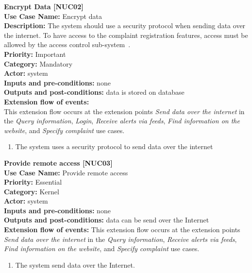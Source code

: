 \documentclass[11pt,twoside]{article}
\begin{document}
\textbf{Encrypt Data [NUC02]}\\
\textbf{Use Case Name:} Encrypt data\\
\textbf{Description:} The system should use a security protocol when sending data over the internet. To have access to the complaint
registration features, access must be allowed by the access control sub-system~\cite{hw-usecase}.\\
\textbf{Priority:} Important \\ 
\textbf{Category:} Mandatory \\ 
\textbf{Actor:} system\\
\textbf{Inputs and pre-conditions:} none\\ 
\textbf{Outputs and post-conditions:} data is stored on database \\  
\textbf{Extension flow of events:}\\
This extension flow occurs at the extension points \textit{Send data over the internet} in the \textit{Query information}, 
\textit{Login}, \textit{Receive alerts via feeds}, \textit{Find information on the website}, and \textit{Specify
complaint} use cases.
\begin{enumerate}
\item The system uses a security protocol to send data over the internet 
\end{enumerate}

\textbf{Provide remote access [NUC03]}\\
\textbf{Use Case Name:} Provide remote access\\
\textbf{Priority:} Essential  \\ 
\textbf{Category:} Kernel \\ 
\textbf{Actor:} system\\
\textbf{Inputs and pre-conditions:} none\\ 
\textbf{Outputs and post-conditions:} data can be send over the Internet\\  
\textbf{Extension flow of events:} This extension flow occurs at the extension points \textit{Send data over the internet} in the
\textit{Query information}, \textit{Receive alerts via feeds}, \textit{Find information on the website}, and
\textit{Specify complaint} use cases.
\\
\begin{enumerate}
\item The system send data over the Internet.
\end{enumerate}
\end{document}

